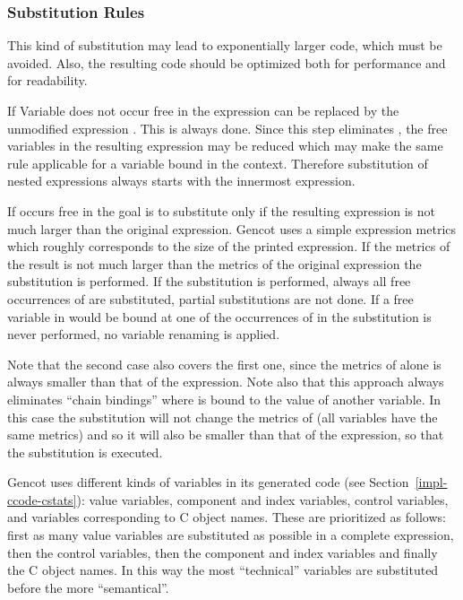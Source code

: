 \subsubsection{Substitution Rules}

This kind of substitution may lead to exponentially larger code, which must be avoided. Also, the resulting code should be 
optimized both for performance and for readability. 

If Variable  does not occur free in  the  expression can be replaced by the unmodified 
expression . This is always done. Since this step eliminates , the free variables in the resulting expression may be 
reduced which may make the same rule applicable for a variable bound in the context. Therefore substitution of nested
 expressions always starts with the innermost  expression.

If  occurs free in  the goal is to substitute only if the resulting expression is not much larger than 
the original expression. Gencot uses a simple expression metrics which roughly corresponds to the size of the printed expression.
If the metrics of the result is not much larger than the metrics of the original  expression the substitution is 
performed. If the substitution is performed, always all free occurrences of  are substituted, partial substitutions are 
not done. If a free variable in  would be bound at one of the occurrences of  in  the substitution 
is never performed, no variable renaming is applied.

Note that the second case also covers the first one, since the metrics of  alone is always smaller than that of the 
 expression. Note also that this approach always eliminates ``chain bindings'' where  is bound to the value of another
variable. In this case the substitution will not change the metrics of  (all variables have the same metrics) and so it 
will also be smaller than that of the  expression, so that the substitution is executed.

Gencot uses different kinds of variables in its generated code (see Section~\ref{impl-ccode-cstats}): value variables, component and 
index variables, control variables, and variables corresponding to C object names. These are prioritized as follows: first as many value 
variables are substituted as possible in a complete expression, then the control variables, then the component and index variables and
finally the C object names. In this way the most ``technical'' variables are substituted before the more ``semantical''.

